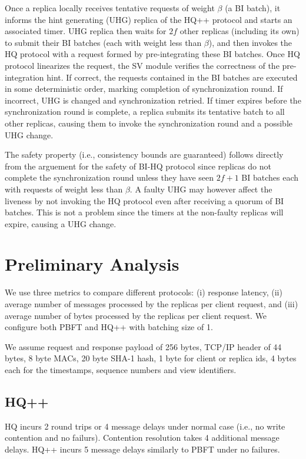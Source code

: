 \documentclass[twocolumn,10pt]{article}
\begin{document}
Once a replica locally receives tentative requests of weight $\beta$ (a BI batch), it informs the hint
generating (UHG) replica of the HQ++ protocol and starts an associated timer. 
UHG replica then waits for $2f$ other replicas (including
its own) to submit their BI batches (each with weight less than $\beta$), and then
invokes the HQ protocol with a request formed by pre-integrating these BI batches.
Once HQ protocol linearizes the request, the SV module verifies the correctness of the pre-integration
hint. If correct, the requests contained
in the BI batches are executed in some deterministic order, marking completion of synchronization
round. If incorrect, UHG is changed and synchronization retried. If timer expires before
the synchronization round is complete, a replica submits its tentative batch to all other replicas,
causing them to invoke the synchronization round and a possible UHG change.

 The safety property (i.e., consistency bounds are guaranteed) follows
directly from the arguement for the safety of BI-HQ protocol since replicas do not complete
the synchronization round unless they have seen $2f+1$ BI batches each with requests of weight less 
than $\beta$.  A faulty UHG may however affect the liveness
by not invoking the HQ protocol even after receiving a quorum of BI batches. This is not a problem
since the timers at the non-faulty replicas will expire, causing a UHG change.


\section{Preliminary Analysis}
We use three metrics to compare different protocols: (i) response latency,
(ii) average number of messages processed by the replicas per client request, and (iii) 
average number of bytes processed by the replicas per client request.
We configure both PBFT and HQ++ with batching size of 1. 


 We assume request and response payload of 256 bytes, TCP/IP header of 44 bytes,
8 byte MACs, 20 byte SHA-1 hash, 1 byte for client or replica ids, 4 bytes each for
the timestamps, sequence numbers and view identifiers.

\subsection{HQ++}
HQ incurs 2 round trips or 4 message delays under normal case (i.e., no write contention and no
failurs). Contention resolution takes 4 additional message delays. 
HQ++ incurs 5 message delays similarly to PBFT under no failures.
\end{document}
